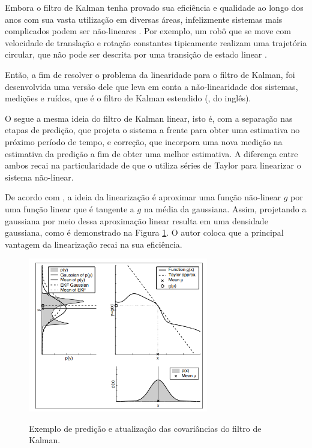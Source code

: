\documentclass[acronym, symbols, table]{fei}
\begin{document}
			Embora o filtro de Kalman tenha provado sua eficiência e qualidade ao longo dos anos com sua vasta utilização em diversas áreas, infelizmente sistemas mais complicados podem ser não-lineares \cite{khodarahmi2023review}. Por exemplo, um robô que se move com velocidade de translação e rotação constantes tipicamente realizam uma trajetória circular, que não pode ser descrita por uma transição de estado linear \cite{thrun2002probabilistic}.
			
			Então, a fim de resolver o problema da linearidade para o filtro de Kalman, foi desenvolvida uma versão dele que leva em conta a não-linearidade dos sistemas, medições e ruídos, que é o filtro de Kalman estendido (, do inglês).
			
			O  segue a mesma ideia do filtro de Kalman linear, isto é, com a separação nas etapas de predição, que projeta o sistema a frente para obter uma estimativa no próximo período de tempo, e correção, que incorpora uma nova medição na estimativa da predição a fim de obter uma melhor estimativa. A diferença entre ambos recai na particularidade de que o  utiliza séries de Taylor para linearizar o sistema não-linear.
			
			De acordo com \textcite{thrun2002probabilistic}, a ideia da linearização é aproximar uma função não-linear $g$ por uma função linear que é tangente a $g$ na média da gaussiana. Assim, projetando a gaussiana por meio dessa aproximação linear resulta em uma densidade gaussiana, como é demonstrado na Figura \ref{fig:ekf_linearizacao}. O autor coloca que a principal vantagem da linearização recai na sua eficiência.
			
			\begin{figure}[!htb]
				\centering
				\caption{Exemplo de predição e atualização das covariâncias do filtro de Kalman.}
				\includegraphics[width=0.7\textwidth]{figura_linearizacao_ekf.png}
				\label{fig:ekf_linearizacao}
			\end{figure}
			
\end{document}
